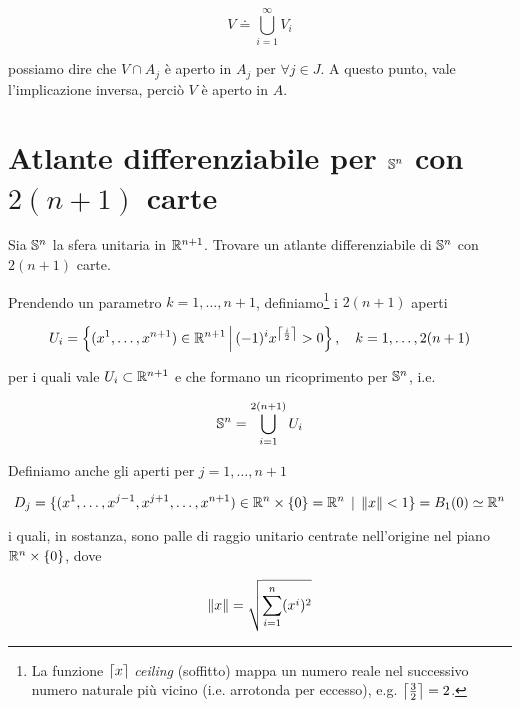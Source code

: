 \begin{equation}
	V \doteq \bigcup_{i=1}^{\infty} V_{i}
\end{equation}

possiamo dire che $ V \cap A_{j} $ è aperto in $ A_{j} $ per $ \forall j \in J $. A questo punto, vale l'implicazione inversa, perciò $ V $ è aperto in $ A $.

\section{Atlante differenziabile per $ \S^{n} $ con $ 2(n+1) $ carte}\label{es2-1}

\begin{tcolorbox}
	Sia $ \S^{n} $ la sfera unitaria in $ \R^{n+1} $. Trovare un atlante differenziabile di $ \S^{n} $ con $ 2(n+1) $ carte.
\end{tcolorbox}

Prendendo un parametro $ k = 1,\dots,n+1 $, definiamo\footnote{%
	La funzione $ \ceil*{x} $ \textit{ceiling} (soffitto) mappa un numero reale nel successivo numero naturale più vicino (i.e. arrotonda per eccesso), e.g. $ \ceil*{\frac{3}{2}} = 2 $.%
} i $ 2(n+1) $ aperti

\begin{equation}
	U_{i} = \left\{ (x^{1},\dots,x^{n+1}) \in \R^{n+1} \st (-1)^{i} x^{\ceil*{\frac{i}{2}}} > 0 \right\} \qcomma k = 1, \dots, 2(n+1)
\end{equation}

per i quali vale $ U_{i} \subset \R^{n+1} $ e che formano un ricoprimento per $ \S^{n} $, i.e.

\begin{equation}
	\S^{n} = \bigcup_{i=1}^{2(n+1)} U_{i}
\end{equation}

Definiamo anche gli aperti per $ j = 1,\dots,n+1 $

\begin{equation}
	D_{j} = \{ (x^{1},\dots,x^{j-1},x^{j+1},\dots,x^{n+1}) \in \R^{n} \times \{0\} = \R^{n} \, \mid \, \norm{x} < 1 \} = B_{1}(0) \simeq \R^{n}
\end{equation}

i quali, in sostanza, sono palle di raggio unitario centrate nell'origine nel piano $ \R^{n} \times \{0\} $, dove

\begin{equation}
	\norm{x} = \sqrt{ \sum_{i=1}^{n} (x^{i})^{2} }
\end{equation}

